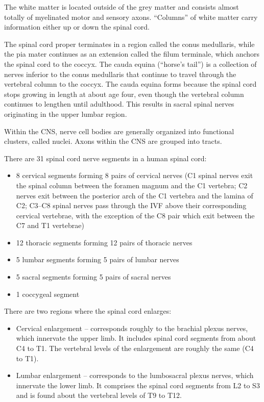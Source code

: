 The white matter is located outside of the grey matter and consists almost totally of myelinated motor and sensory axons. ``Columns'' of white matter carry information either up or down the spinal cord.

The spinal cord proper terminates in a region called the conus medullaris, while the pia mater continues as an extension called the filum terminale, which anchors the spinal cord to the coccyx. The cauda equina (``horse's tail'') is a collection of nerves inferior to the conus medullaris that continue to travel through the vertebral column to the coccyx. The cauda equina forms because the spinal cord stops growing in length at about age four, even though the vertebral column continues to lengthen until adulthood. This results in sacral spinal nerves originating in the upper lumbar region.

Within the CNS, nerve cell bodies are generally organized into functional clusters, called nuclei. Axons within the CNS are grouped into tracts.

There are 31 spinal cord nerve segments in a human spinal cord:

\begin{itemize}
\tightlist
\item
  8 cervical segments forming 8 pairs of cervical nerves (C1 spinal nerves exit the spinal column between the foramen magnum and the C1 vertebra; C2 nerves exit between the posterior arch of the C1 vertebra and the lamina of C2; C3--C8 spinal nerves pass through the IVF above their corresponding cervical vertebrae, with the exception of the C8 pair which exit between the C7 and T1 vertebrae)
\item
  12 thoracic segments forming 12 pairs of thoracic nerves
\item
  5 lumbar segments forming 5 pairs of lumbar nerves
\item
  5 sacral segments forming 5 pairs of sacral nerves
\item
  1 coccygeal segment
\end{itemize}

There are two regions where the spinal cord enlarges:

\begin{itemize}
\tightlist
\item
  Cervical enlargement -- corresponds roughly to the brachial plexus nerves, which innervate the upper limb. It includes spinal cord segments from about C4 to T1. The vertebral levels of the enlargement are roughly the same (C4 to T1).
\item
  Lumbar enlargement -- corresponds to the lumbosacral plexus nerves, which innervate the lower limb. It comprises the spinal cord segments from L2 to S3 and is found about the vertebral levels of T9 to T12.
\end{itemize}

